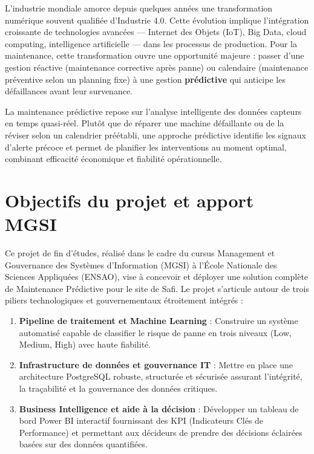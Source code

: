 \documentclass[a4paper,12pt,twoside]{report}
\begin{document}
L'industrie mondiale amorce depuis quelques années une transformation numérique souvent qualifiée d'Industrie 4.0. Cette évolution implique l'intégration croissante de technologies avancées --- Internet des Objets (IoT), Big Data, cloud computing, intelligence artificielle --- dans les processus de production. Pour la maintenance, cette transformation ouvre une opportunité majeure : passer d'une gestion réactive (maintenance corrective après panne) ou calendaire (maintenance préventive selon un planning fixe) à une gestion \textbf{prédictive} qui anticipe les défaillances avant leur survenance.

La maintenance prédictive repose sur l'analyse intelligente des données capteurs en temps quasi-réel. Plutôt que de réparer une machine défaillante ou de la réviser selon un calendrier préétabli, une approche prédictive identifie les signaux d'alerte précoce et permet de planifier les interventions au moment optimal, combinant efficacité économique et fiabilité opérationnelle.

\section*{Objectifs du projet et apport MGSI}

Ce projet de fin d'études, réalisé dans le cadre du cursus Management et Gouvernance des Systèmes d'Information (MGSI) à l'École Nationale des Sciences Appliquées (ENSAO), vise à concevoir et déployer une solution complète de Maintenance Prédictive pour le site de Safi. Le projet s'articule autour de trois piliers technologiques et gouvernementaux étroitement intégrés :

\begin{enumerate}
    \item \textbf{Pipeline de traitement et Machine Learning} : Construire un système automatisé capable de classifier le risque de panne en trois niveaux (Low, Medium, High) avec haute fiabilité.
    
    \item \textbf{Infrastructure de données et gouvernance IT} : Mettre en place une architecture PostgreSQL robuste, structurée et sécurisée assurant l'intégrité, la traçabilité et la gouvernance des données critiques.
    
    \item \textbf{Business Intelligence et aide à la décision} : Développer un tableau de bord Power BI interactif fournissant des KPI (Indicateurs Clés de Performance) et permettant aux décideurs de prendre des décisions éclairées basées sur des données quantifiées.
\end{enumerate}
\end{document}
